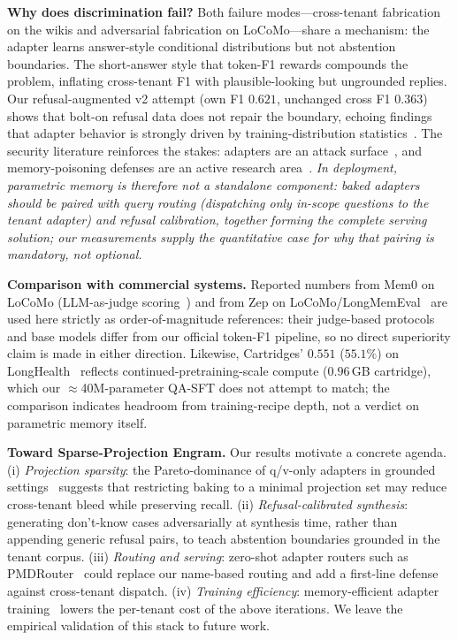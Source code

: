\documentclass[conference]{IEEEtran}
\begin{document}
\textbf{Why does discrimination fail?} Both failure modes---cross-tenant fabrication on the wikis and adversarial fabrication on LoCoMo---share a mechanism: the adapter learns answer-style conditional distributions but not abstention boundaries. The short-answer style that token-F1 rewards compounds the problem, inflating cross-tenant F1 with plausible-looking but ungrounded replies. Our refusal-augmented v2 attempt (own F1 $0.621$, unchanged cross F1 $0.363$) shows that bolt-on refusal data does not repair the boundary, echoing findings that adapter behavior is strongly driven by training-distribution statistics~\cite{lorabackdoor2026}. The security literature reinforces the stakes: adapters are an attack surface~\cite{lorabackdoor2026}, and memory-poisoning defenses are an active research area~\cite{tmanm2026}. \emph{In deployment, parametric memory is therefore not a standalone component: baked adapters should be paired with query routing (dispatching only in-scope questions to the tenant adapter) and refusal calibration, together forming the complete serving solution; our measurements supply the quantitative case for why that pairing is mandatory, not optional.}

\textbf{Comparison with commercial systems.} Reported numbers from Mem0 on LoCoMo (LLM-as-judge scoring~\cite{chhikara2025mem0}) and from Zep on LoCoMo/LongMemEval~\cite{zep2025, packer2023memgpt} are used here strictly as order-of-magnitude references: their judge-based protocols and base models differ from our official token-F1 pipeline, so no direct superiority claim is made in either direction. Likewise, Cartridges' $0.551$ ($55.1\%$) on LongHealth~\cite{hazy2025cartridges} reflects continued-pretraining-scale compute ($0.96$\,GB cartridge), which our $\approx$40M-parameter QA-SFT does not attempt to match; the comparison indicates headroom from training-recipe depth, not a verdict on parametric memory itself.

\textbf{Toward Sparse-Projection Engram.} Our results motivate a concrete agenda. (i) \textit{Projection sparsity}: the Pareto-dominance of q/v-only adapters in grounded settings~\cite{qvpareto2026} suggests that restricting baking to a minimal projection set may reduce cross-tenant bleed while preserving recall. (ii) \textit{Refusal-calibrated synthesis}: generating don't-know cases adversarially at synthesis time, rather than appending generic refusal pairs, to teach abstention boundaries grounded in the tenant corpus. (iii) \textit{Routing and serving}: zero-shot adapter routers such as PMDRouter~\cite{pmd2026} could replace our name-based routing and add a first-line defense against cross-tenant dispatch. (iv) \textit{Training efficiency}: memory-efficient adapter training~\cite{carelora2026} lowers the per-tenant cost of the above iterations. We leave the empirical validation of this stack to future work.
\end{document}
